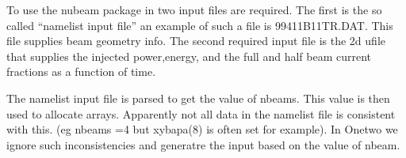 

To use the nubeam package in \ot two input files are required. The first is the
so called ``namelist input file'' an example of such a file is  99411B11TR.DAT.
 This file supplies beam geometry info. The second required input file is the
2d ufile that supplies the  injected power,energy, and the full and half beam
current fractions as a function of time. 


The namelist input file is parsed to get the value of nbeams. This value is then
used  to allocate arrays. Apparently not all data in the namelist file is
consistent with this. (eg nbeams =4 but  xybapa(8) is often set for example). In
Onetwo we ignore such inconsistencies and generatre the input based on the value
of nbeam. 
